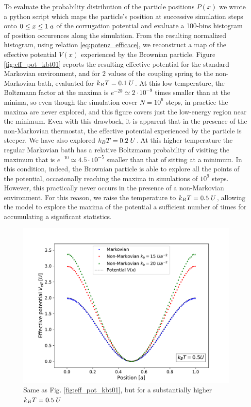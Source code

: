 To evaluate the probability distribution of the particle positions $P(x)$ we wrote a python script which maps the particle's position at successive simulation steps onto $0\leq x \leq 1\hspace{0.1cm}a$ of the corrugation potential and evaluate a 100-bins histogram of position occurences along the simulation. From the resulting normalized histogram, using relation \eqref{eq:potenz_efficace}, we reconstruct a map of the effective potential $V(x)$ experienced by the Brownian particle. Figure \ref{fig:eff_pot_kbt01} reports the resulting effective potential for the standard Markovian environment, and for 2 values of the coupling spring to the non-Markovian bath, evaluated for $k_BT=0.1\hspace{0.1cm}U$. At this low temperature, the Boltzmann factor at the maxima is $e^{-20} \simeq 2 \cdot 10^{-9}$ times smaller than at the minima, so even though the simulation cover $N=10^9$ steps, in practice the maxima are never explored, and this figure covers just the low-energy region near the minimum. Even with this drawback, it is apparent that in the presence of the non-Markovian thermostat, the effective potential experienced by the particle is steeper. We have also explored $k_BT=0.2\hspace{0.1cm}U$. At this higher temperature the regular Markovian bath has a relative Boltzmann probability of visiting the maximum that is $e^{-10} \simeq 4.5 \cdot 10^{-5}$ smaller than that of sitting at a minimum. In this condition, indeed, the Brownian particle is able to explore all the points of the potential, occasionally reaching the maxima in simulations of $10^9$ steps. However, this practically never occurs in the presence of a non-Markovian environment. For this reason, we raise the temperature to $k_BT=0.5\hspace{0.1cm}U$, allowing the model to explore the maxima of the potential a sufficient number of times for accumulating a significant statistics. 
\begin{figure}[ht!]
    \centering
    \includegraphics[width=\textwidth]{T05_U_eff.pdf}
    \caption{Same as Fig. \ref{fig:eff_pot_kbt01}, but for a substantially higher $k_BT=0.5\hspace{0.1cm}U$}
    \label{fig:effpotenz}
\end{figure}
